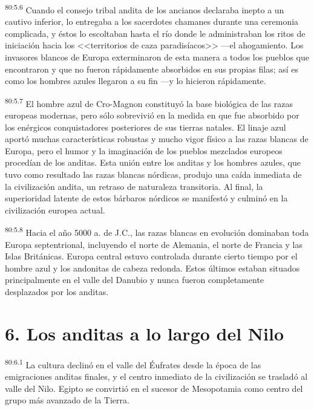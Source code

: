 \par
\textsuperscript{80:5.6} Cuando el consejo tribal andita de los ancianos declaraba inepto a un cautivo inferior, lo entregaba a los sacerdotes chamanes durante una ceremonia complicada, y éstos lo escoltaban hasta el río donde le administraban los ritos de iniciación hacia los <<territorios de caza paradisíacos>> ---el ahogamiento. Los invasores blancos de Europa exterminaron de esta manera a todos los pueblos que encontraron y que no fueron rápidamente absorbidos en sus propias filas; así es como los hombres azules llegaron a su fin ---y lo hicieron rápidamente.

\par
\textsuperscript{80:5.7} El hombre azul de Cro-Magnon constituyó la base biológica de las razas europeas modernas, pero sólo sobrevivió en la medida en que fue absorbido por los enérgicos conquistadores posteriores de sus tierras natales. El linaje azul aportó muchas características robustas y mucho vigor físico a las razas blancas de Europa, pero el humor y la imaginación de los pueblos mezclados europeos procedían de los anditas. Esta unión entre los anditas y los hombres azules, que tuvo como resultado las razas blancas nórdicas, produjo una caída inmediata de la civilización andita, un retraso de naturaleza transitoria. Al final, la superioridad latente de estos bárbaros nórdicos se manifestó y culminó en la civilización europea actual.

\par
\textsuperscript{80:5.8} Hacia el año 5000 a. de J.C., las razas blancas en evolución dominaban toda Europa septentrional, incluyendo el norte de Alemania, el norte de Francia y las Islas Británicas. Europa central estuvo controlada durante cierto tiempo por el hombre azul y los andonitas de cabeza redonda. Estos últimos estaban situados principalmente en el valle del Danubio y nunca fueron completamente desplazados por los anditas.

\section*{6. Los anditas a lo largo del Nilo}
\par
\textsuperscript{80:6.1} La cultura declinó en el valle del Éufrates desde la época de las emigraciones anditas finales, y el centro inmediato de la civilización se trasladó al valle del Nilo. Egipto se convirtió en el sucesor de Mesopotamia como centro del grupo más avanzado de la Tierra.

